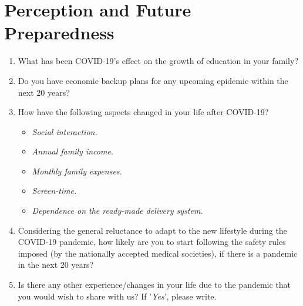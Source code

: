 \section*{Perception and Future Preparedness}
\begin{enumerate}[resume]
    \item What has been COVID-19's effect on the growth of education in your family?
    \item Do you have economic backup plans for any upcoming epidemic within the next $20$ years?
    \item How have the following aspects changed in your life after COVID-19?
    \begin{itemize}
        \item \textit{Social interaction.}
        \item \textit{Annual family income.}
        \item \textit{Monthly family expenses.}
        \item \textit{Screen-time.}
        \item \textit{Dependence on the ready-made delivery system.}
    \end{itemize}
    \item Considering the general reluctance to adapt to the new lifestyle during the COVID-19 pandemic, how likely are you to start following the safety rules imposed (by the nationally accepted medical societies), if there is a pandemic in the next $20$ years?
    \item Is there any other experience/changes in your life due to the pandemic that you would wish to share with us? If '\textit{Yes}', please write.
\end{enumerate}